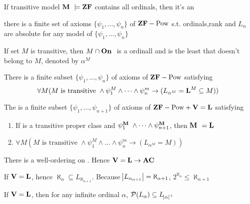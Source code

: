 \documentclass[11pt]{article}
\begin{document}
\begin{definition}[]
If transitive model \(\textbf{M }\models\textbf{ZF}\) contains all ordinals, then it's an
\end{definition}

\begin{lemma}[]
there is a finite set of axioms \(\{\psi_1,\dots,\psi_n\}\) of
\(\textbf{ZF}-\text{Pow}\) s.t. ordinals,rank and \(L_\alpha\) are absolute for any
model of \(\{\psi_1,\dots,\psi_n\}\)
\end{lemma}

\begin{lemma}[]
If set \(M\) is transitive, then \(M\cap\textbf{On }\) is a ordinall and is the least that
doesn't belong to \(M\), denoted by \(\alpha^M\)
\end{lemma}

\begin{theorem}[]
There is a finite subset \(\{\psi_1,\dots,\psi_n\}\) of axioms of
\(\textbf{ZF}-\text{Pow}\) satisfying
\begin{equation*}
\forall M(M\text{ is transitive }\wedge\psi_1^M\wedge\dots\wedge\psi_n^m\to
(L_{\alpha^M}=\textbf{L}^M\subseteq M))
\end{equation*}
\end{theorem}

\begin{theorem}[]
The is a finite subset \(\{\psi_1,\dots,\psi_{n+1}\}\) of axioms of
\(\textbf{ZF}-\text{Pow}+\textbf{V}=\textbf{L}\) satisfying
\begin{enumerate}
\item If \cm is a transitive proper class and
\(\psi_1^{\textbf{M }}\wedge\dots\wedge\psi_{n+1}^{\textbf{M }}\), then \(\textbf{M }=\textbf{L}\)
\item \(\forall M(M\text{ is transitive
      }\wedge\psi_1^M\wedge\dots\wedge\psi_n^m\to (L_{\alpha^M}=M))\)
\end{enumerate}
\end{theorem}

\begin{theorem}[]
There is a well-ordering on \gll. Hence \(\textbf{V}=\textbf{L}\to\textbf{AC}\)
\end{theorem}

If \(\textbf{V}=\textbf{L}\), hence \(\aleph_\alpha\subseteq L_{\aleph_{\alpha+1}}\). Because
\(\abs{L_{\alpha_{\alpha+1}}}=\aleph_{\alpha+1}\),
\(2^{\aleph_\alpha}\le\aleph_{\alpha+1}\) 
\begin{theorem}[]
If \(\textbf{V}=\textbf{L}\), then for any infinite ordinal \(\alpha\),
\(\mathcal{P}(L_\alpha)\subseteq L_{\abs{\alpha}^+}\)
\end{theorem}
\end{document}

